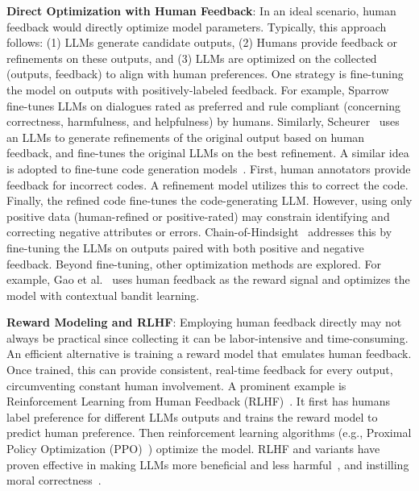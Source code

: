 \documentclass[a4paper,oneside]{book}
\begin{document}
\textbf{Direct Optimization with Human Feedback}: In an ideal scenario, human feedback would directly optimize model parameters. Typically, this approach follows: (1) LLMs generate candidate outputs, (2) Humans provide feedback or refinements on these outputs, and (3) LLMs are optimized on the collected (outputs, feedback) to align with human preferences. One strategy is fine-tuning the model on outputs with positively-labeled feedback. For example, Sparrow~\cite{glaese2022improving} fine-tunes LLMs on dialogues rated as preferred and rule compliant (concerning correctness, harmfulness, and helpfulness) by humans. Similarly, Scheurer~\cite{scheurer2023training} uses an LLMs to generate refinements of the original output based on human feedback, and fine-tunes the original LLMs on the best refinement. A similar idea is adopted to fine-tune code generation models~\cite{chen2023improving}. First, human annotators provide feedback for incorrect codes. A refinement model utilizes this to correct the code. Finally, the refined code fine-tunes the code-generating LLM. However, using only positive data (human-refined or positive-rated) may constrain identifying and correcting negative attributes or errors. Chain-of-Hindsight~\cite{liu2023chain} addresses this by fine-tuning the LLMs on outputs paired with both positive and negative feedback. Beyond fine-tuning, other optimization methods are explored. For example, Gao et al.~\cite{gao2023continually} uses human feedback as the reward signal and optimizes the model with contextual bandit learning.

\textbf{Reward Modeling and RLHF}: Employing human feedback directly may not always be practical since collecting it can be labor-intensive and time-consuming. An efficient alternative is training a reward model that emulates human feedback. Once trained, this can provide consistent, real-time feedback for every output, circumventing constant human involvement. A prominent example is Reinforcement Learning from Human Feedback (RLHF)~\cite{ouyang2022training}. It first has humans label preference for different LLMs outputs and trains the reward model to predict human preference. Then reinforcement learning algorithms (e.g., Proximal Policy Optimization (PPO)~\cite{schulman2017proximal}) optimize the model. RLHF and variants have proven effective in making LLMs more beneficial and less harmful~\cite{bai2022training}, and instilling moral correctness~\cite{ganguli2023capacity}.
\end{document}
